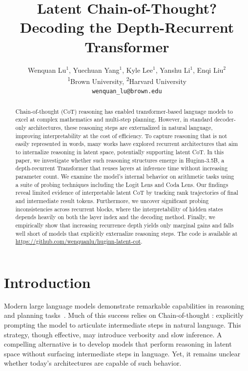 \documentclass{article} %
\title{Latent Chain-of-Thought? Decoding the Depth-Recurrent Transformer}
\author{Wenquan Lu$^{1}$, Yuechuan Yang$^{1}$, Kyle Lee$^{1}$, Yanshu Li$^{1}$, Enqi Liu$^{2}$\\
\textsuperscript{1}Brown University, \textsuperscript{2}Harvard University\\
\texttt{wenquan\_lu@brown.edu} \\
}
\begin{document}
\ifcolmsubmission
\linenumbers
\fi

\maketitle

\begin{abstract}
Chain-of-thought (CoT) reasoning has enabled transformer-based language models to excel at complex mathematics and multi-step planning. However, in standard decoder-only architectures, these reasoning steps are externalized in natural language, improving interpretability at the cost of efficiency. To capture reasoning that is not easily represented in words, many works have explored recurrent architectures that aim to internalize reasoning in latent space, potentially supporting latent CoT. In this paper, we investigate whether such reasoning structures emerge in Huginn-3.5B, a depth-recurrent Transformer that reuses layers at inference time without increasing parameter count. We examine the model's internal behavior on arithmetic tasks using a suite of probing techniques including the Logit Lens and Coda Lens. Our findings reveal limited evidence of interpretable latent CoT by tracking rank trajectories of final and intermediate result tokens. Furthermore, we uncover significant probing inconsistencies across recurrent blocks, where the interpretability of hidden states depends heavily on both the layer index and the decoding method. Finally, we empirically show that increasing recurrence depth yields only marginal gains and falls well short of models that explicitly externalize reasoning steps. The code is available at \url{https://github.com/wenquanlu/huginn-latent-cot}.
\end{abstract}

\section{Introduction}
Modern large language models demonstrate remarkable capabilities in reasoning and planning tasks~\citep{guo2025deepseek, rela7}. Much of this success relies on Chain-of-thought \citep{wei2022chain, rela1, rela2}: explicitly prompting the model to articulate intermediate steps in natural language. This strategy, though effective, may introduce verbosity and slow inference. A compelling alternative is to develop models that perform reasoning in latent space without surfacing intermediate steps in language. Yet, it remains unclear whether today's architectures are capable of such behavior.
\end{document}
